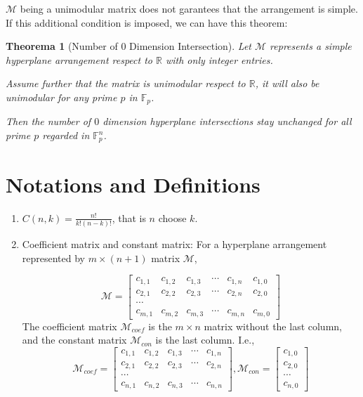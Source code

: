\documentclass[12pt, a4paper]{article}
\newtheorem{theorem}{Theorema}[subsection]
\theoremstyle{definition}
\theoremstyle{remark}
\newcommand{\bb}[1]{\mathbb{#1}}
\begin{document}
$\mathcal{M}$ being a unimodular matrix does not garantees that the arrangement is simple. If this additional condition is imposed, we can have this theorem: 

\begin{theorem}[Number of 0 Dimension Intersection]
	Let $\mathcal{M}$ represents a simple hyperplane arrangement respect to $\bb{R}$ with only integer entries.

	Assume further that the matrix is unimodular respect to $\bb{R}$, it will also be unimodular for any prime $p$ in $\mathbb{F}_p$.

	Then the number of $0$ dimension hyperplane intersections stay unchanged for all prime $p$ regarded in $\mathbb{F}_p^n$.
\end{theorem}

\section*{Notations and Definitions}

\begin{enumerate}
	\item $C(n, k) = \frac{n!}{k!(n-k)!}$, that is $n$ choose $k$.
	\item Coefficient matrix and constant matrix: 
	For a hyperplane arrangement represented by $m \times (n+1) $ matrix $\mathcal{M}$, 

	$$
	\mathcal{M} =
	\begin{bmatrix}
		c_{1,1} & c_{1,2} & c_{1,3} & \cdots & c_{1,n} & c_{1,0} \\
		c_{2,1} & c_{2,2} & c_{2,3} & \cdots & c_{2,n} & c_{2,0} 
			 \\ \cdots \\
		c_{m,1} & c_{m,2} & c_{m,3} & \cdots & c_{m,n} & c_{m,0}
	\end{bmatrix}
	$$
	The coefficient matrix $\mathcal{M}_{coef}$ is the $ m \times n$ matrix without the last column, and the constant matrix $\mathcal{M}_{con}$ is the last column. I.e., 
	$$
	\mathcal{M}_{coef} =
	\begin{bmatrix}
		c_{1,1} & c_{1,2} & c_{1,3} & \cdots & c_{1,n} \\
		c_{2,1} & c_{2,2} & c_{2,3} & \cdots & c_{2,n} 
			 \\ \cdots \\
		c_{n,1} & c_{n,2} & c_{n,3} & \cdots & c_{n,n}
	\end{bmatrix}
	, \mathcal{M}_{con} =
	\begin{bmatrix}
		c_{1,0} \\
		c_{2,0} \\
		\cdots \\
		c_{n,0}
	\end{bmatrix}
	$$
\end{enumerate}
\end{document}
